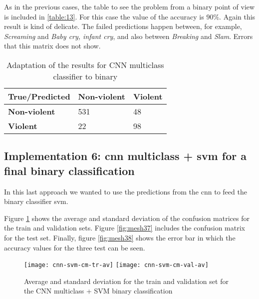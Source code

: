 	As in the previous cases, the table to see the problem from a binary point of view is included in \ref{table:13}. For this case the value of the accuracy is $90\%$. Again this result is kind of delicate. The failed predictions happen between, for example, \textit{Screaming} and \textit{Baby cry, infant cry}, and also between \textit{Breaking} and \textit{Slam}. Errors that this matrix does not show.
	
	\begin{table}[H]
	\begin{center}
		\begin{tabular}{| m{6em} || m{6em} | m{6em} ||}
		\hline
		True/Predicted & \textbf{Non-violent} & \textbf{Violent} \\
		\hline\hline
		\textbf{Non-violent} & 531 & 48 \\
		\hline
		\textbf{Violent} & 22 & 98 \\
		\hline
		\end{tabular}
	\end{center}
	\caption{Adaptation of the results for CNN multiclass classifier to binary}
	\label{table:12}
	\end{table}

\subsection{Implementation 6: \acrshort{cnn} multiclass + \acrshort{svm} for a final binary classification}

	In this last approach we wanted to use the predictions from the \acrshort{cnn} to feed the binary classifier \acrshort{svm}.
	
	Figure \ref{fig:mesh36} shows the average and standard deviation of the confusion matrices for the train and validation sets. Figure \ref{fig:mesh37} includes the confusion matrix for the test set. Finally, figure \ref{fig:mesh38} shows the error bar in which the accuracy values for the three test can be seen.
	
	\begin{figure}[H]
		\hspace*{-1.7cm}
		\centering
		\captionsetup{justification=centering}
		\texttt{[image: cnn-svm-cm-tr-av]}%
		\texttt{[image: cnn-svm-cm-val-av]}
		\caption{Average and standard deviation for the train and validation set for the CNN multiclass + SVM binary classification}
		\label{fig:mesh36}
	\end{figure}
	
